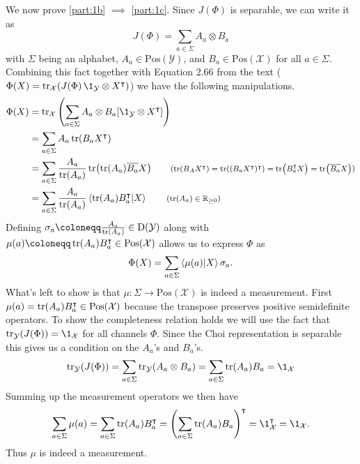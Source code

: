 \documentclass[boxes,pages,color=SeaGreen]{homework}
\newcommand{\X}{\mathcal{X}}
\newcommand{\Y}{\mathcal{Y}}
\newcommand{\smalltag}[1]{\tag*{\footnotesize (#1)}}
\newcommand{\Pos}{\mathrm{Pos}}
\newcommand{\Density}{\mathrm{D}}
\begin{document}
\begin{solution}
  We now prove \ref{part:1b} $\implies$ \ref{part:1c}.
  Since $J(\Phi)$ is separable, we can write it as
  \begin{equation*}
    J(\Phi) = \sum_{a\in\Sigma}A_a\otimes B_a
  \end{equation*}
  with $\Sigma$ being an alphabet, $A_a\in\Pos(\Y)$, and $B_a\in\Pos(\X)$ for all $a\in\Sigma$.
  Combining this fact together with Equation 2.66 from the text ($\Phi(X) = \tr_\X(J(\Phi)\,\1_\Y\otimes X^\intercal)$) we have the following manipulations.
  \begin{align*}
    \Phi(X) & = \tr_\X\qty(\sum_{a\in\Sigma}A_a\otimes B_a [\1_\Y\otimes X^\intercal])                                                                                                              \\
            & = \sum_{a\in\Sigma}A_a\tr(B_a X^\intercal)                                                                                                                                            \\
            & = \sum_{a\in\Sigma}\frac{A_a}{\tr(A_a)}\tr(\tr(A_a)\overline{B_a} X) \smalltag{$\tr(B_AX^\intercal) = \tr((B_aX^\intercal)^\intercal) = \tr(B_a^\intercal X) = \tr(\overline{B_a}X)$} \\
            & = \sum_{a\in\Sigma}\frac{A_a}{\tr(A_a)}\ip{\tr(A_a)B_a^\intercal}{X} \smalltag{$\tr(A_a)\in\R_{\geq 0}$}
  \end{align*}
  Defining $\sigma_a \defeq \frac{A_a}{\tr(A_a)}\in\Density(\Y)$ along with $\mu(a) \defeq \tr(A_a)B_a^\intercal \in \Pos(\X)$ allows us to express $\Phi$ as
  \begin{equation*}
    \Phi(X) = \sum_{a\in\Sigma}\ip{\mu(a)}{X}\sigma_a.
  \end{equation*}
  What's left to show is that $\mu:\Sigma\to\Pos(\X)$ is indeed a measurement.
  First $\mu(a) = \tr(A_a)B_a^\intercal\in\Pos(\X)$ because the transpose preserves positive semidefinite operators.
  To show the completeness relation holds we will use the fact that $\tr_\Y(J(\Phi)) = \1_\X$ for all channels $\Phi$.
  Since the Choi representation is separable this gives us a condition on the $A_a$'s and $B_a$'s.
  \begin{equation*}
    \tr_\Y(J(\Phi)) = \sum_{a\in\Sigma}\tr_\Y(A_a\otimes B_a) = \sum_{a\in\Sigma}\tr(A_a)B_a = \1_\X
  \end{equation*}
  Summing up the measurement operators we then have
  \begin{align*}
    \sum_{a\in\Sigma}\mu(a) = \sum_{a\in\Sigma}\tr(A_a)B_a^\intercal = \qty(\sum_{a\in\Sigma}\tr(A_a)B_a)^\intercal = \1_\X^\intercal = \1_\X.
  \end{align*}
  Thus $\mu$ is indeed a measurement.



\end{solution}
\end{document}
